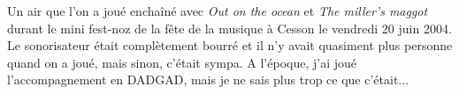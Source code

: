 Un air que l'on a joué enchaîné avec \emph{Out on the ocean} et \emph{The
miller's maggot} durant le mini fest-noz de la fête de la musique à Cesson le
vendredi 20 juin 2004. Le sonorisateur était complètement bourré et il n'y
avait quasiment plus personne quand on a joué, mais sinon, c'était sympa. A
l'époque, j'ai joué l'accompagnement en DADGAD, mais je ne sais plus trop ce
que c'était...

\tune
